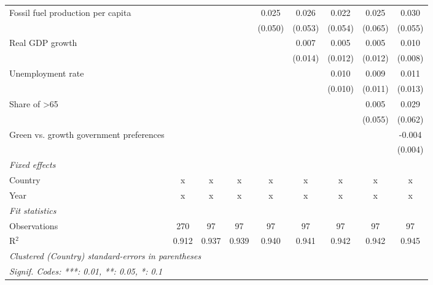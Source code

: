 \begin{table}[htbp]
\begin{tabular}{lcccccccc}
      Fossil fuel production per capita       &               &              &             & 0.025       & 0.026   & 0.022   & 0.025   & 0.030\\   
                                              &               &              &             & (0.050)     & (0.053) & (0.054) & (0.065) & (0.055)\\   
      Real GDP growth                         &               &              &             &             & 0.007   & 0.005   & 0.005   & 0.010\\   
                                              &               &              &             &             & (0.014) & (0.012) & (0.012) & (0.008)\\   
      Unemployment rate                       &               &              &             &             &         & 0.010   & 0.009   & 0.011\\   
                                              &               &              &             &             &         & (0.010) & (0.011) & (0.013)\\   
      Share of >65                            &               &              &             &             &         &         & 0.005   & 0.029\\   
                                              &               &              &             &             &         &         & (0.055) & (0.062)\\   
      Green vs. growth government preferences &               &              &             &             &         &         &         & -0.004\\   
                                              &               &              &             &             &         &         &         & (0.004)\\   
      \emph{Fixed effects}\\
      Country                                 & x             & x            & x           & x           & x       & x       & x       & x\\  
      Year                                    & x             & x            & x           & x           & x       & x       & x       & x\\  
      \midrule \emph{Fit statistics}\\
      Observations                            & 270           & 97           & 97          & 97          & 97      & 97      & 97      & 97\\  
      R$^2$                                   & 0.912         & 0.937        & 0.939       & 0.940       & 0.941   & 0.942   & 0.942   & 0.945\\  
      \midrule
      \multicolumn{9}{l}{\emph{Clustered (Country) standard-errors in parentheses}}\\
      \multicolumn{9}{l}{\emph{Signif. Codes: ***: 0.01, **: 0.05, *: 0.1}}\\
   \end{tabular}
\end{table}


